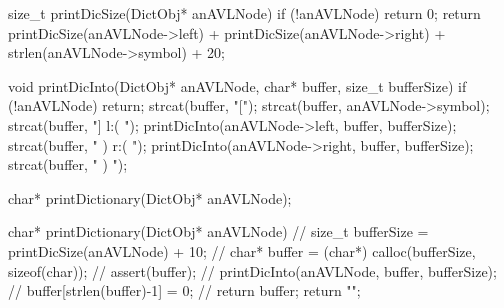 \startCCode
size_t printDicSize(DictObj* anAVLNode) {
  if (!anAVLNode) return 0;
  return printDicSize(anAVLNode->left)
    + printDicSize(anAVLNode->right)
    + strlen(anAVLNode->symbol) + 20;
}
\stopCCode

\startCCode
void printDicInto(DictObj* anAVLNode, char* buffer, size_t bufferSize) {
  if (!anAVLNode) return;
  strcat(buffer, "[");
  strcat(buffer, anAVLNode->symbol);
  strcat(buffer, "] l:( ");
  printDicInto(anAVLNode->left, buffer, bufferSize);
  strcat(buffer, " ) r:( ");
  printDicInto(anAVLNode->right, buffer, bufferSize);
  strcat(buffer, " ) ");
}
\stopCCode

\startCHeader
char* printDictionary(DictObj* anAVLNode);
\stopCHeader

\startCCode
char* printDictionary(DictObj* anAVLNode) {
//  size_t bufferSize = printDicSize(anAVLNode) + 10;
//  char* buffer = (char*) calloc(bufferSize, sizeof(char));
//  assert(buffer);
//  printDicInto(anAVLNode, buffer, bufferSize);
//  buffer[strlen(buffer)-1] = 0;
//  return buffer;
  return "";
}
\stopCCode

